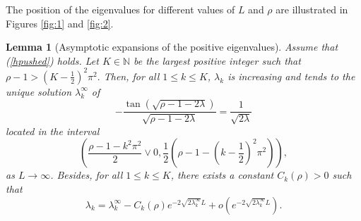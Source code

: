 \documentclass[11pt]{article}
\theoremstyle{plain}
\newtheorem{lemma}{Lemma}[section]
\begin{document}
The position of the eigenvalues for different values of $L$ and $\rho$ are illustrated in Figures \ref{fig:1} and \ref{fig:2}. 


\begin{lemma}[Asymptotic expansions of the positive eigenvalues]\label{eigenvlocasymp} Assume that (\ref{hpushed}) holds. Let $K\in\mathbb{N}$ be the largest positive integer such that
$
\rho-1>\left(K-\frac{1}{2}\right)^2\pi^2.
$ Then, for all $1\leqslant k\leqslant K$, $\lambda_k$ is increasing and tends to the unique solution $\lambda_k^\infty$ of 
\begin{equation}
    -\frac{\tan(\sqrt{\rho-1-2\lambda})}{\sqrt{\rho-1-2\lambda}}=\frac{1}{\sqrt{2\lambda}}
    \label{eqlim}
\end{equation}{}
located in the interval
\begin{equation*}
    \left(\frac{\rho-1-k^2\pi^2}{2}\vee 0,\frac{1}{2}\left(\rho-1 - \left(k-\frac{1}{2}\right)^2\pi^2\right)\right),
\end{equation*} as $L\to\infty$. Besides, for all $1\leqslant k\leqslant K$, there exists a constant $C_k(\rho)>0$ such that 
\begin{equation*}
    \lambda_k=\lambda_k^\infty-C_k(\rho)e^{-2\sqrt{2\lambda_k^\infty} L}+o\left(e^{-2\sqrt{2\lambda_k^\infty}L}\right).
\end{equation*} 

\end{lemma}
\end{document}

